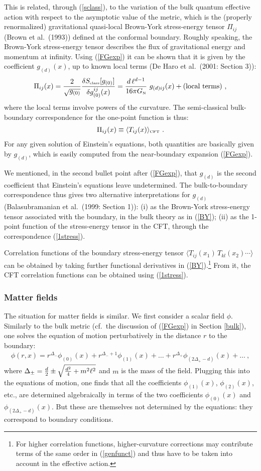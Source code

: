 \documentclass[12pt]{article}
\newcommand\bra[1]{{\langle {#1}|}}
\newcommand\ket[1]{{|{#1}\rangle}}
\def\d{\delta}
\def\bra{\langle}
\def\ket{\rangle}
\def\d{\delta}
\def\D{\Delta}
\def\f{\phi}
\renewcommand{\^}[1]{\hat{#1}}
\newcommand{\tn}[1]{\mbox{\tiny #1}}
\newcommand{\bea}{\begin{eqnarray}}
\newcommand{\eea}{\end{eqnarray}}
\newcommand{\eq}[1]{(\ref{#1})}
\def\GN{G_{\mbox{\tn N}}}
\begin{document}
This is related, through \eq{sclass}, to the variation of the bulk quantum effective action with respect to the asymptotic value of the metric, which is the (properly renormalized) gravitational quasi-local Brown-York stress-energy tensor $\Pi_{ij}$ (Brown et al.~(1993)) defined at the conformal boundary. Roughly speaking, the Brown-York stress-energy tensor describes the flux of gravitational energy and momentum at infinity. Using \eq{FGexp} it can be shown that it is given by the coefficient $g_{(d)}(x)$, up to known local terms (De Haro et al.~(2001: Section 3)):
\bea\label{BY}
\Pi_{ij}(x)={2\over\sqrt{g_{(0)}}}{\d S_{\tn{class}}[g_{(0)}]\over\d g^{ij}_{(0)}(x)}= {d \, \ell^{d-1} \over 16\pi\GN}~g_{(d)ij}(x)+ \mbox{(local terms)}~,
\eea
where the local terms involve powers of the curvature. The semi-classical bulk-boundary correspondence for the one-point function is thus: 
\bea\label{1stress}
\Pi_{ij}(x)\equiv \bra T_{ij}(x)\ket_{\tn{CFT}}~.
\eea
For any given solution of Einstein's equations, both quantities are basically given by $g_{(d)}$, which is easily computed from the near-boundary expansion \eq{FGexp}.

We mentioned, in the second bullet point after \eq{FGexp}, that $g_{(d)}$ is the second coefficient that Einstein's equations leave undetermined. The bulk-to-boundary correspondence thus gives two alternative interpretations for $g_{(d)}$ (Balasubramanian et al.~(1999: Section 1)): (i) as the Brown-York stress-energy tensor associated with the boundary, in the bulk theory as in \eq{BY}; (ii) as the 1-point function of the stress-energy tensor in the CFT, through the correspondence \eq{1stress}.

Correlation functions of the boundary stress-energy tensor $\bra T_{ij}(x_1)\,T_{kl}(x_2)\cdots\ket$ can be obtained by taking further functional derivatives in \eq{BY}.\footnote{For higher correlation functions, higher-curvature corrections may contribute terms of the same order in \eq{genfunct} and thus have to be taken into account in the effective action.} From it, the CFT correlation functions can be obtained using \eq{1stress}.

\subsubsection{Matter fields}\label{matter} 

The situation for matter fields is similar. We first consider a scalar field $\f$. Similarly to the bulk metric (cf.~the discussion of \eq{FGexp} in Section \ref{bulk}), one solves the equation of motion perturbatively in the distance $r$ to the boundary:
\bea\label{expandf}
\f(r,x)=r^{\D_-}\f_{(0)}(x)+r^{\D_-+1}\f_{(1)}(x)+\ldots+r^{\D_+}\f_{(2\D_+-d)}(x)+\ldots~,
\eea
where $\D_\pm={{d\over2}\pm\sqrt{{d^2\over4}+m^2\ell^2}}$ and $m$ is the mass of the field. Plugging this into the equations of motion, one finds that all the coefficients $\f_{(1)}(x)$, $\f_{(2)}(x)$, etc., are determined algebraically in terms of the two coefficients $\f_{(0)}(x)$ and $\f_{(2\D_+-d)}(x)$. But these are themselves not determined by the equations: they correspond to boundary conditions. 
\end{document}
